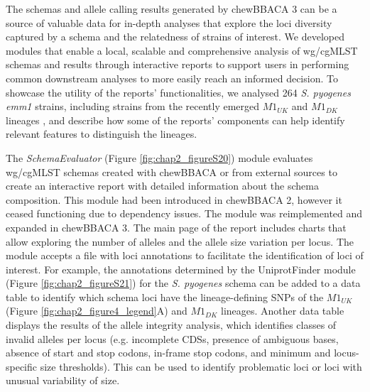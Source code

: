 The schemas and allele calling results generated by chewBBACA 3 can be a source of valuable data for in-depth analyses that explore the loci diversity captured by a schema and the relatedness of strains of interest. We developed modules that enable a local, scalable and comprehensive analysis of \ac{wg/cgMLST} schemas and results through interactive reports to support users in performing common downstream analyses to more easily reach an informed decision. To showcase the utility of the reports' functionalities, we analysed 264 \textit{S. pyogenes} \textit{emm1} strains, including strains from the recently emerged $M1_{UK}$ and $M1_{DK}$ lineages \citep{lynskey_emergence_2019, johannesen_increase_2023}, and describe how some of the reports’ components can help identify relevant features to distinguish the lineages.

The \textit{SchemaEvaluator} (Figure \ref{fig:chap2_figureS20}) module evaluates \ac{wg/cgMLST} schemas created with chewBBACA or from external sources to create an interactive report with detailed information about the schema composition. This module had been introduced in chewBBACA 2, however it ceased functioning due to dependency issues. The module was reimplemented and expanded in chewBBACA 3. The main page of the report includes charts that allow exploring the number of alleles and the allele size variation per locus. The module accepts a file with loci annotations to facilitate the identification of loci of interest. For example, the annotations determined by the UniprotFinder module (Figure \ref{fig:chap2_figureS21}) for the \textit{S. pyogenes} schema can be added to a data table to identify which schema loci have the lineage-defining \acp{SNP} of the $M1_{UK}$ (Figure \ref{fig:chap2_figure4_legend}A) and $M1_{DK}$ lineages. Another data table displays the results of the allele integrity analysis, which identifies classes of invalid alleles per locus (e.g. incomplete \acp{CDS}, presence of ambiguous bases, absence of start and stop codons, in-frame stop codons, and minimum and locus-specific size thresholds). This can be used to identify problematic loci or loci with unusual variability of size.

